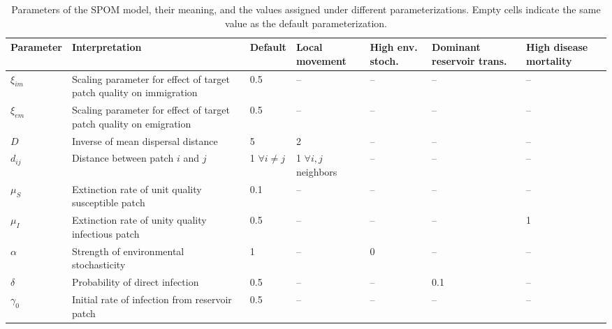 \documentclass{article}
\begin{document}
\begin{table}[h!]   
\caption{Parameters of the SPOM model, their meaning, and the values assigned under different parameterizations.  Empty cells indicate the same value as the default parameterization.}
\begin{tabular}{l p{4cm} p{1.5cm} p{1.5cm} p{1.5cm} p{1.5cm} p{1.5cm}}
Parameter & Interpretation &  Default & Local movement & High env. stoch. & Dominant reservoir trans. & High disease mortality \\
\hline
$\xi_{im}$ & Scaling parameter for effect of target patch quality on immigration & 0.5 & -- & -- & -- & --\\
$\xi_{em}$ & Scaling parameter for effect of target patch quality on emigration & 0.5 & -- & -- & --& --\\
$D$& Inverse of mean dispersal distance & 5 & 2 & -- & -- & --\\
$d_{ij}$ & Distance between patch $i$ and $j$ & 1 $\forall i \neq j$ & 1 $\forall i, j$ neighbors & -- & -- & --\\
\hline
$\mu_S$ & Extinction rate of unit quality susceptible patch & 0.1 & -- & -- & -- & --\\
$\mu_I$ & Extinction rate of unity quality infectious patch & 0.5 & -- & -- & -- & 1\\
$\alpha$ & Strength of environmental stochasticity & 1 & -- & 0 & -- & --\\
\hline
$\delta$ & Probability of direct infection & 0.5 & -- & -- & 0.1 & --\\
$\gamma_0$ & Initial rate of infection from reservoir patch & 0.5 & -- & -- & -- & --
\end{tabular}
\label{params}
\end{table}
\end{document}
